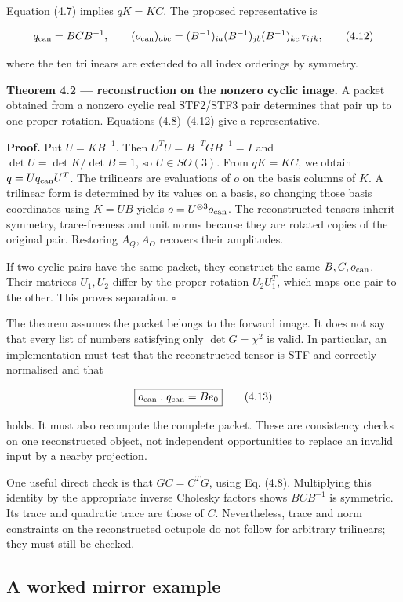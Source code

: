 \documentclass[
  11pt,
  a4paper]{article}
\begin{document}
Equation (4.7) implies \(qK=KC\). The proposed representative is

\[
q_{\rm can}=BCB^{-1},\qquad
(o_{\rm can})_{abc}
=(B^{-1})_{ia}(B^{-1})_{jb}(B^{-1})_{kc}\,\tau_{ijk},
\tag{4.12}
\]

where the ten trilinears are extended to all index orderings by symmetry.

\textbf{Theorem 4.2 --- reconstruction on the nonzero cyclic image.} A packet obtained from a nonzero cyclic real STF2/STF3 pair determines that pair up to one proper rotation. Equations (4.8)--(4.12) give a representative.

\textbf{Proof.} Put \(U=KB^{-1}\). Then
\(U^TU=B^{-T}GB^{-1}=I\) and
\(\det U=\det K/\det B=1\), so \(U\in SO(3)\).
From \(qK=KC\), we obtain \(q=Uq_{\rm can}U^T\).
The trilinears are evaluations of \(o\) on the basis columns of \(K\). A trilinear form is determined by its values on a basis, so changing those basis coordinates using \(K=UB\) yields
\(o=U^{\otimes3}o_{\rm can}\).
The reconstructed tensors inherit symmetry, trace-freeness and unit norms because they are rotated copies of the original pair. Restoring \(A_Q,A_O\) recovers their amplitudes.

If two cyclic pairs have the same packet, they construct the same \(B,C,o_{\rm can}\). Their matrices \(U_1,U_2\) differ by the proper rotation \(U_2U_1^T\), which maps one pair to the other. This proves separation. \(\square\)

The theorem assumes the packet belongs to the forward image. It does not say that every list of numbers satisfying only \(\det G=\chi^2\) is valid. In particular, an implementation must test that the reconstructed tensor is STF and correctly normalised and that

\[
\boxed{o_{\rm can}:q_{\rm can}=Be_0}
\tag{4.13}
\]

holds. It must also recompute the complete packet. These are consistency checks on one reconstructed object, not independent opportunities to replace an invalid input by a nearby projection.

One useful direct check is that \(GC=C^TG\), using Eq. (4.8). Multiplying this identity by the appropriate inverse Cholesky factors shows \(BCB^{-1}\) is symmetric. Its trace and quadratic trace are those of \(C\). Nevertheless, trace and norm constraints on the reconstructed octupole do not follow for arbitrary trilinears; they must still be checked.

\hypertarget{a-worked-mirror-example}{%
\subsection{A worked mirror example}\label{a-worked-mirror-example}}
\end{document}

